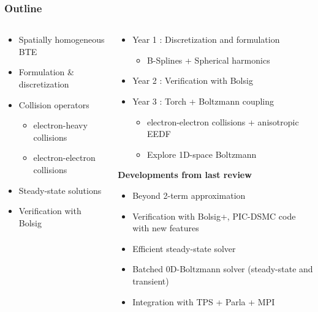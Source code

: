 \documentclass[mathserif, aspectratio=169]{beamer}
\begin{document}
\begin{frame}
	\frametitle{Outline}
	\begin{columns}
		\begin{column}{0.4\textwidth}
				\begin{itemize}
				\item Spatially homogeneous BTE
				\item Formulation \& discretization
				\item Collision operators
				\begin{itemize}
					\item electron-heavy collisions
					\item electron-electron collisions
				\end{itemize}
				\item Steady-state solutions
				\item Verification with Bolsig
			\end{itemize}
		\end{column}
		\begin{column}{0.6\textwidth}
			\begin{itemize}
				\item Year 1 : Discretization and formulation 
				\begin{itemize}
					\item B-Splines + Spherical harmonics
				\end{itemize}	
				\item Year 2 : Verification with Bolsig
				\item Year 3 : Torch + Boltzmann coupling
					\begin{itemize}
						\item electron-electron collisions + anisotropic EEDF
						\item Explore 1D-space Boltzmann
					\end{itemize}
			\end{itemize}
			\vspace{0.25in}
			\textbf{Developments from last review}
				\begin{itemize}
					\item Beyond 2-term approximation
					\item Verification with Bolsig+, PIC-DSMC code with new features
					\item Efficient steady-state solver
					\item Batched 0D-Boltzmann solver (steady-state and transient)
					\item Integration with TPS + Parla + MPI
				\end{itemize}
		\end{column}
	\end{columns}
\end{frame}
\end{document}
